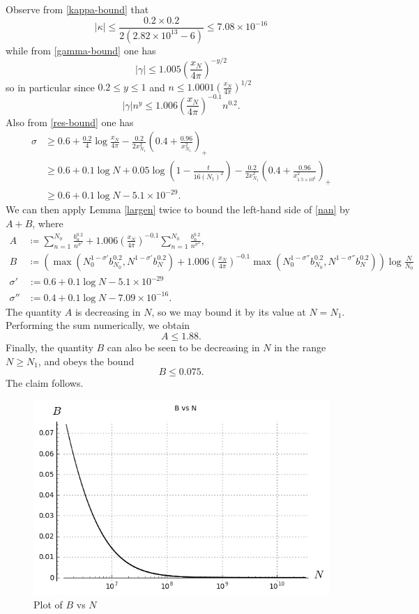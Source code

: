 Observe from \eqref{kappa-bound} that
$$ |\kappa| \leq \frac{0.2 \times 0.2}{2(2.82 \times 10^{13}-6)} \leq 7.08 \times 10^{-16}$$
while from \eqref{gamma-bound} one has
$$
|\gamma| \leq 1.005 \left( \frac{x_N}{4\pi} \right)^{-y/2}$$
so in particular since $0.2 \leq y \leq 1$ and $n \leq 1.0001 (\frac{x_N}{4\pi})^{1/2}$
$$
|\gamma| n^y \leq 1.006 \left( \frac{x_N}{4\pi} \right)^{-0.1} n^{0.2}.$$
Also from \eqref{res-bound} one has
\begin{align*}
\sigma &\geq 0.6 + \frac{0.2}{4} \log \frac{x_N}{4\pi} - \frac{0.2}{2x_{N_1}^2} \left(0.4+\frac{0.96}{x_{N_1}^2}\right)_+ \\
&\geq 0.6 + 0.1 \log N + 0.05 \log \left(1 - \frac{t}{16 (N_1)^2}\right) - \frac{0.2}{2x_{N_1}^2} \left(0.4+\frac{0.96}{x_{1.5\times 10^6}^2}\right)_+ \\
&\geq 0.6 + 0.1 \log N - 5.1 \times 10^{-29}.
\end{align*}
We can then apply Lemma \ref{largen} twice to bound the left-hand side of \eqref{nan} by $A+B$, where
\begin{align*}
A &\coloneqq \sum_{n=1}^{N_0} \frac{b_n^{0.2}}{n^{\sigma'}} + 1.006 \left( \frac{x_N}{4\pi} \right)^{-0.1} \sum_{n=1}^{N_0} \frac{b_n^{0.2}}{n^{\sigma''}}, \\
B &\coloneqq (\max( N_0^{1-\sigma'} b_{N_0}^{0.2}, N^{1-\sigma'} b_N^{0.2} ) + 1.006 \left( \frac{x_N}{4\pi} \right)^{-0.1} 
\max( N_0^{1-\sigma''} b_{N_0}^{0.2}, N^{1-\sigma''} b_N^{0.2} ) )\log \frac{N}{N_0} \\
\sigma' &:= 0.6 + 0.1 \log N - 5.1 \times 10^{-29} \\
\sigma'' &:= 0.4 + 0.1 \log N - 7.09 \times 10^{-16}.
\end{align*}
The quantity $A$ is decreasing in $N$, so we may bound it by its value at $N = N_1$.  Performing the sum numerically, we obtain
$$ A \leq 1.88.$$
Finally, the quantity $B$ can also be seen to be decreasing in $N$ in the range $N \geq N_1$, and obeys the bound
$$ B \leq 0.075.$$
The claim follows.

\begin{figure}[h!]
  \includegraphics[width=0.7\linewidth]{B_vs_N.png}
  \caption{Plot of $B$ vs $N$}
\end{figure}


